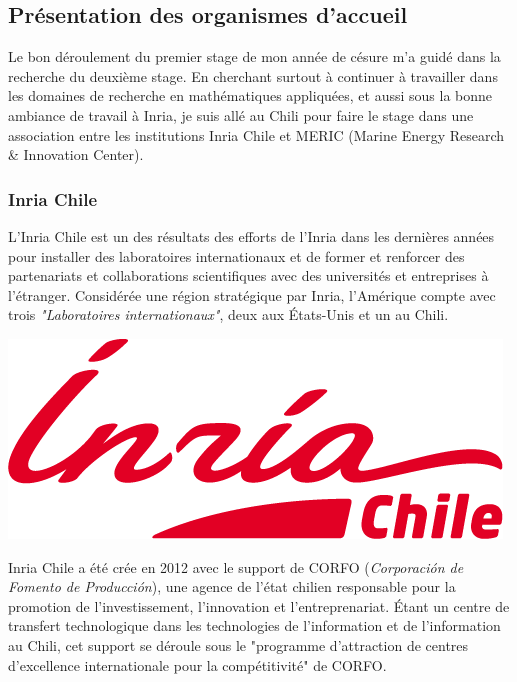 \subsection{Présentation des organismes d'accueil}

\indent Le bon déroulement du premier stage de mon année de césure m'a guidé dans la recherche du deuxième stage. En cherchant surtout à continuer à travailler dans les domaines de recherche en mathématiques appliquées, et aussi sous la bonne ambiance de travail à Inria, je suis allé au Chili pour faire le stage dans une association entre les institutions Inria Chile et MERIC (Marine Energy Research \& Innovation Center).

\subsubsection{Inria Chile}

\indent L'Inria Chile est un des résultats des efforts de l'Inria dans les dernières années pour installer des laboratoires internationaux et de former et renforcer des partenariats et collaborations scientifiques avec des universités et entreprises à l'étranger. Considérée une région stratégique par Inria, l'Amérique compte avec trois \emph{"Laboratoires internationaux"}, deux aux États-Unis et un au Chili.

\begingroup
\centering
\includegraphics[scale=.3]{figures/logos/Inria-Chile.png}
\endgroup

\indent Inria Chile a été crée en 2012 avec le support de CORFO (\emph{Corporación de Fomento de Producción}), une agence de l'état chilien responsable pour la promotion de l'investissement, l'innovation et l'entreprenariat. Étant un centre de transfert technologique dans les technologies de l'information et de  l'information au Chili, cet support se déroule sous le "programme d'attraction de centres d'excellence internationale pour la compétitivité" de CORFO.

